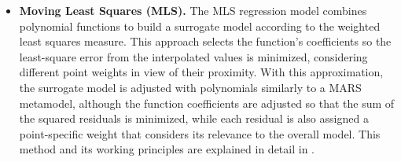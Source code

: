 \documentclass[12pt,number,preprint,review,times]{elsarticle}
\begin{document}
\begin{itemize}

\item \textbf{Moving Least Squares (MLS).} The MLS regression model combines polynomial functions to build a surrogate model according to the weighted least squares measure. This approach selects the function's coefficients so the least-square error from the interpolated values is minimized, considering different point weights in view of their proximity.  With this approximation, the surrogate model is adjusted with polynomials similarly to a MARS metamodel, although the function coefficients are adjusted so that the sum of the squared residuals is minimized, while each residual is also assigned a point-specific weight that considers its relevance to the overall model. This method and its working principles are explained in detail in \citep{MLS,LancasterMLS}.%


\end{itemize}
\end{document}
